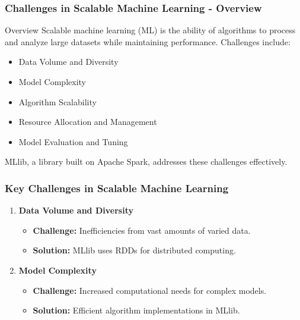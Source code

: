 \documentclass[aspectratio=169]{beamer}
\begin{document}
\begin{frame}[fragile]
    \frametitle{Challenges in Scalable Machine Learning - Overview}
    \begin{block}{Overview}
        Scalable machine learning (ML) is the ability of algorithms to process and analyze large datasets while maintaining performance. Challenges include:
        \begin{itemize}
            \item Data Volume and Diversity
            \item Model Complexity
            \item Algorithm Scalability
            \item Resource Allocation and Management
            \item Model Evaluation and Tuning
        \end{itemize}
        MLlib, a library built on Apache Spark, addresses these challenges effectively.
    \end{block}
\end{frame}

\begin{frame}[fragile]
    \frametitle{Key Challenges in Scalable Machine Learning}
    \begin{enumerate}
        \item \textbf{Data Volume and Diversity}
            \begin{itemize}
                \item \textbf{Challenge:} Inefficiencies from vast amounts of varied data.
                \item \textbf{Solution:} MLlib uses RDDs for distributed computing.
            \end{itemize}
        
        \item \textbf{Model Complexity}
            \begin{itemize}
                \item \textbf{Challenge:} Increased computational needs for complex models.
                \item \textbf{Solution:} Efficient algorithm implementations in MLlib.
            \end{itemize}
    \end{enumerate}
\end{frame}
\end{document}
